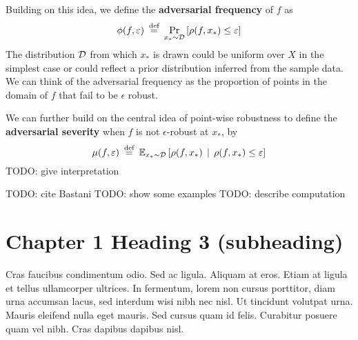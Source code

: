 Building on this idea, we define the
{\bf adversarial frequency} of $f$
as
\begin{equation}{}
  \phi(f, \varepsilon)
  \medspace
  \stackrel{\text{def}}{=}
  \medspace
  \Pr_{x_* \sim \mathcal{D}}
  \left[
    \rho(f, x_*) \leq \varepsilon
  \right]
\end{equation}
The distribution $\mathcal{D}$ from which $x_*$ is drawn
could be uniform over $X$ in the simplest case or
could reflect a prior distribution inferred from the sample data.
We can think of the adversarial frequency as
the proportion of points in the domain of $f$ that fail to be
$\epsilon$ robust.

We can further build on the central idea of point-wise robustness
to define the
{\bf adversarial severity} when $f$ is not $\epsilon$-robust at $x_*$, by
\begin{equation}{}
  \mu(f,\varepsilon)
  \medspace
  \stackrel{\text{def}}{=}
  \medspace
  \mathbb{E}_{x_* \sim \mathcal{D}}
  \left[
    \rho(f, x_*)
    \medspace
    \medspace | \medspace
    \medspace
    \rho(f, x_*) \leq \varepsilon
  \right]
\end{equation}
TODO: give interpretation

TODO: cite Bastani
TODO: show some examples
TODO: describe computation






\section{Chapter 1 Heading 3 (subheading)}

Cras faucibus condimentum odio. Sed ac ligula. Aliquam at eros. Etiam at ligula et tellus ullamcorper ultrices. In fermentum, lorem non cursus porttitor, diam urna accumsan lacus, sed interdum wisi nibh nec nisl. Ut tincidunt volutpat urna. Mauris eleifend nulla eget mauris. Sed cursus quam id felis. Curabitur posuere quam vel nibh. Cras dapibus dapibus nisl.\par

